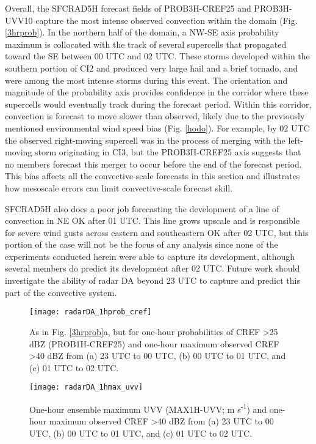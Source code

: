 Overall, the SFCRAD5H forecast fields of PROB3H-CREF25 and PROB3H-UVV10 capture the most intense observed convection within the domain (Fig. \ref{3hrprob}). In the northern half of the domain, a NW-SE axis probability maximum is collocated with the track of several supercells that propagated toward the SE between 00 UTC and 02 UTC. These storms developed within the southern portion of CI2 and produced very large hail and a brief tornado, and were among the most intense storms during this event. The orientation and magnitude of the probability axis provides confidence in the corridor where these supercells would eventually track during the forecast period. Within this corridor, convection is forecast to move slower than observed, likely due to the previously mentioned environmental wind speed bias (Fig. \ref{hodo}). For example, by 02 UTC the observed right-moving supercell was in the process of merging with the left-moving storm originating in CI3, but the PROB3H-CREF25 axis suggests that no members forecast this merger to occur before the end of the forecast period. This bias affects all the convective-scale forecasts in this section and illustrates how mesoscale errors can limit convective-scale forecast skill.

SFCRAD5H also does a poor job forecasting the development of a line of convection in NE OK after 01 UTC. This line grows upscale and is responsible for severe wind gusts across eastern and southeastern OK after 02 UTC, but this portion of the case will not be the focus of any analysis since none of the experiments conducted herein were able to capture its development, although several members do predict its development after 02 UTC. Future work should investigate the ability of radar DA beyond 23 UTC to capture and predict this part of the convective system.

\begin{figure}
\centering
\texttt{[image: radarDA\_1hprob\_cref]}
\caption{As in Fig. \ref{3hrprob}a, but for one-hour probabilities of CREF \textgreater 25 dBZ (PROB1H-CREF25) and one-hour maximum observed CREF \textgreater 40 dBZ from (a) 23 UTC to 00 UTC, (b) 00 UTC to 01 UTC, and (c) 01 UTC to 02 UTC.}
\label{1hprob_cref}
\end{figure}
\begin{figure}
\centering
\texttt{[image: radarDA\_1hmax\_uvv]}
\caption{One-hour ensemble maximum UVV (MAX1H-UVV; m s\textsuperscript{-1}) and one-hour maximum observed CREF \textgreater 40 dBZ from (a) 23 UTC to 00 UTC, (b) 00 UTC to 01 UTC, and (c) 01 UTC to 02 UTC.}
\label{1hmax_uvv}
\end{figure}

